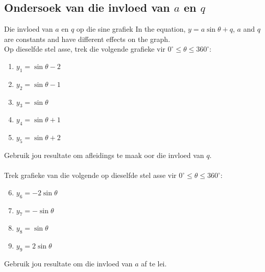 \subsection*{Ondersoek van die invloed van $a$ en $q$}
\nopagebreak
\begin{Investigation}{Die invloed van $a$ en $q$ op die sine grafiek}
In the equation, $y=a\sin\theta+q$, $a$ and $q$ are constants and have different effects on the graph.\\
Op dieselfde stel asse, trek die volgende grafieke vir $0^{\circ}\leq \theta\leq 360^ {\circ}$:
\begin{enumerate}[noitemsep, label=\textbf{\arabic*}. ] 
\item $y_1=\sin\theta -2$
\item $y_2=\sin\theta -1$
\item $y_3=\sin\theta $
\item $y_4=\sin\theta +1$
\item $y_5=\sin\theta +2$
\end{enumerate}
Gebruik jou resultate om afleidings te maak oor die invloed van $q$.\\
\\
Trek grafieke van die volgende op dieselfde stel asse vir $0^{\circ}\leq \theta\leq 360^ {\circ}$:
\begin{enumerate}[noitemsep, label=\textbf{\arabic*}. ] 
\setcounter{enumi}{5}
\item $y_6=-2\sin\theta $
\item $y_7=-\sin\theta $
\item $y_8=\sin\theta $
\item $y_9=2\sin\theta $
\end{enumerate}
Gebruik jou resultate om die invloed van $a$ af te lei.
\end{Investigation}
